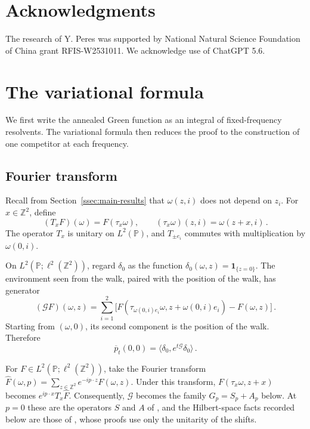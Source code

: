 \documentclass[11pt]{amsart}
\theoremstyle{plain}
\theoremstyle{definition}
\newcommand{\Z}{\mathbb Z}
\renewcommand{\P}{\mathbb P}
\newcommand{\1}{\mathbf 1}
\newcommand{\ip}[2]{\langle #1,#2\rangle}
\begin{document}
\section*{Acknowledgments}
The research of Y. Peres was supported by National Natural Science Foundation of China grant
RFIS-W2531011.  We acknowledge use of ChatGPT 5.6.

\section{The variational formula}\label{sec:variational}

We first write the annealed Green function as an integral of fixed-frequency
resolvents.  The variational formula then reduces the proof to the
construction of one competitor at each frequency.

\subsection{Fourier transform}\label{ssec:fourier}

Recall from Section~\ref{ssec:main-results} that $\omega(z,i)$ does not
depend on $z_i$.  For
$x\in\Z^2$, define
\[
  (T_xF)(\omega)=F(\tau_x\omega),
  \qquad (\tau_x\omega)(z,i)=\omega(z+x,i)\, .
\]
The operator $T_x$ is unitary on $L^2(\P)$, and $T_{\pm e_i}$ commutes with
multiplication by $\omega(0,i)$.

On $L^2(\P;\ell^2(\Z^2))$, regard $\delta_0$ as the function
$\delta_0(\omega,z)=\1_{\{z=0\}}$.  The environment seen
from the walk, paired with the position of the walk, has generator
\begin{equation}\label{eq:joint-generator}
  (\mathcal GF)(\omega,z)=\sum_{i=1}^2
  \bigl[F(\tau_{\omega(0,i)e_i}\omega,z+\omega(0,i)e_i)-F(\omega,z)\bigr]\, .
\end{equation}
Starting from $(\omega,0)$, its second component is the position of the
walk.  Therefore
\begin{equation}\label{eq:return-correlation}
  \overline p_t(0,0)=\ip{\delta_0}{e^{t\mathcal G}\delta_0}\, .
\end{equation}

For $F\in L^2(\P;\ell^2(\Z^2))$, take the Fourier transform
$\widehat F(\omega,p)=\sum_{z\in\Z^2}e^{-ip\cdot z}F(\omega,z)$.  Under this
transform, $F(\tau_x\omega,z+x)$ becomes $e^{ip\cdot x}T_x\widehat F$.
Consequently, $\mathcal G$ becomes the family $G_p=S_p+A_p$ below.  At
$p=0$ these are the operators $S$ and $A$ of \citet*[(1.5)--(1.6)]{LTV18}, and
the Hilbert-space facts recorded below are those of
\citet*[Section~2]{KT17}, whose proofs use only the unitarity of the shifts.
\end{document}
